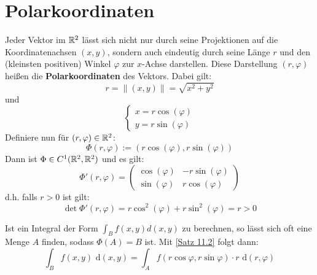 \documentclass[a4paper,twoside,DIV15,BCOR12mm,chapterprefix=true,headings=onelinechapter]{scrbook}
\begin{document}
\setcounter{section}{3}
\section{Polarkoordinaten}
Jeder Vektor im $\mathbb{R}^2$ lässt sich nicht nur durch seine Projektionen auf die Koordinatenachsen $(x,y)$, sondern auch eindeutig durch seine Länge $r$ und den (kleinsten positiven) Winkel $\varphi$ zur $x$-Achse darstellen. Diese Darstellung $(r,\varphi)$ heißen die \textbf{Polarkoordinaten} des Vektors. Dabei gilt:
\[r = \|(x,y)\| = \sqrt{x^2 + y^2}\]
und
\[\begin{cases}
x = r \cos(\varphi)\\
y = r \sin(\varphi)
\end{cases}\]
Definiere nun für $(r,\varphi) \in \mathbb{R}^2$:
\[\Phi(r,\varphi) := (r \cos(\varphi), r \sin(\varphi))\]
Dann ist $\Phi \in C^1(\mathbb{R}^2, \mathbb{R}^2)$ und es gilt: 
\[\Phi'(r,\varphi) = \begin{pmatrix}
\cos(\varphi) & -r \sin(\varphi) \\ 
\sin(\varphi) & r \cos(\varphi)
\end{pmatrix}\]
d.h. falls $r > 0$ ist gilt:
\[\det\Phi'(r,\varphi) = r \cos^2(\varphi) + r \sin^2(\varphi) = r > 0\]


\begin{bemerkung}
Ist ein Integral der Form $\int_B f(x,y) d(x,y)$ zu berechnen, so lässt sich oft eine Menge $A$ finden, sodass $\Phi(A) = B$ ist.
Mit \ref{Satz 11.2} folgt dann:
\[\int_B f(x,y) \text{ d}(x,y) = \int_A f(r \cos \varphi, r \sin \varphi) \cdot r \text{ d}(r,\varphi)\]
\end{bemerkung}
\end{document}
